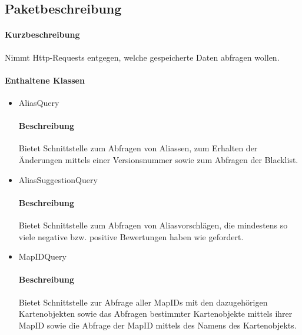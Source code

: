 \subsection*{Paketbeschreibung}%
\paragraph*{Kurzbeschreibung}
Nimmt Http-Requests entgegen, welche gespeicherte Daten abfragen wollen.
\paragraph*{Enthaltene Klassen}
\begin{itemize}
    \item AliasQuery
    		\paragraph*{Beschreibung}
            Bietet Schnittstelle zum Abfragen von Aliassen, zum Erhalten der Änderungen mittels einer Versionsnummer sowie zum Abfragen der Blacklist.
    \item AliasSuggestionQuery
    		\paragraph*{Beschreibung}
    		Bietet Schnittstelle zum Abfragen von Aliasvorschlägen, die mindestens so viele negative bzw. positive Bewertungen haben wie gefordert.
    \item MapIDQuery
    		\paragraph*{Beschreibung}
    		Bietet Schnittstelle zur Abfrage aller MapIDs mit den dazugehörigen Kartenobjekten sowie das Abfragen bestimmter Kartenobjekte mittels ihrer MapID sowie die Abfrage
            der MapID mittels des Namens des Kartenobjekts.

\end{itemize}